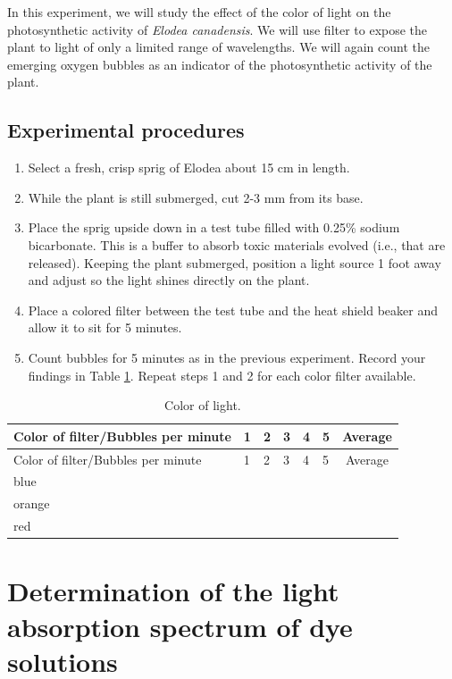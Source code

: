 \documentclass[]{book}
\providecommand{\tightlist}{%
  \setlength{\itemsep}{0pt}\setlength{\parskip}{0pt}}
\theoremstyle{definition}
\theoremstyle{definition}
\theoremstyle{definition}
\theoremstyle{remark}
\begin{document}
In this experiment, we will study the effect of the color of light on
the photosynthetic activity of \emph{Elodea canadensis}. We will use
filter to expose the plant to light of only a limited range of
wavelengths. We will again count the emerging oxygen bubbles as an
indicator of the photosynthetic activity of the plant.

\subsection{Experimental procedures}\label{experimental-procedures-25}

\begin{enumerate}
\def\labelenumi{\arabic{enumi}.}
\tightlist
\item
  Select a fresh, crisp sprig of Elodea about 15 cm in length.
\item
  While the plant is still submerged, cut 2-3 mm from its base.
\item
  Place the sprig upside down in a test tube filled with 0.25\% sodium
  bicarbonate. This is a buffer to absorb toxic materials evolved (i.e.,
  that are released). Keeping the plant submerged, position a light
  source 1 foot away and adjust so the light shines directly on the
  plant.
\item
  Place a colored filter between the test tube and the heat shield
  beaker and allow it to sit for 5 minutes.
\item
  Count bubbles for 5 minutes as in the previous experiment. Record your
  findings in Table \ref{tab:color}. Repeat steps 1 and 2 for each color
  filter available.
\end{enumerate}

\begin{longtable}[]{@{}llllllc@{}}
\caption{\label{tab:color} Color of light.}\tabularnewline
\toprule
Color of filter/Bubbles per minute & 1 & 2 & 3 & 4 & 5 &
Average\tabularnewline
\midrule
\endfirsthead
\toprule
Color of filter/Bubbles per minute & 1 & 2 & 3 & 4 & 5 &
Average\tabularnewline
\midrule
\endhead
blue & & & & & &\tabularnewline
orange & & & & & &\tabularnewline
red & & & & & &\tabularnewline
\bottomrule
\end{longtable}

\section{Determination of the light absorption spectrum of dye
solutions}\label{determination-of-the-light-absorption-spectrum-of-dye-solutions}
\end{document}
